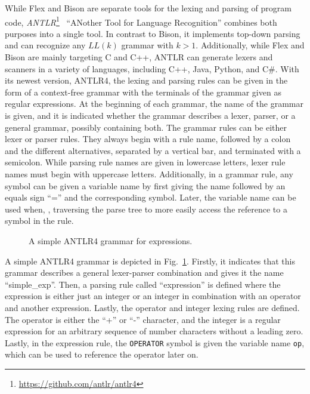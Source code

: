 While Flex and Bison are separate tools for the lexing and parsing of program code, \emph{ANTLR}\footnote{\url{https://github.com/antlr/antlr4}}~\cite{PaQu95} ``ANother Tool for Language Recognition'' combines both purposes into a single tool. In contrast to Bison, it implements top-down parsing and can recognize any $LL(k)$ grammar with $k > 1$. Additionally, while Flex and Bison are mainly targeting C and C++, ANTLR can generate lexers and scanners in a variety of languages, including C++, Java, Python, and C\#.
With its newest version, ANTLR4, the lexing and parsing rules can be given in the form of a context-free grammar with the terminals of the grammar given as regular expressions. At the beginning of each grammar, the name of the grammar is given, and it is indicated whether the grammar describes a lexer, parser, or a general grammar, possibly containing both. The grammar rules can be either lexer or parser rules. They always begin with a rule name, followed by a colon and the different alternatives, separated by a vertical bar, and terminated with a semicolon. While parsing rule names are given in lowercase letters, lexer rule names must begin with uppercase letters.
Additionally, in a grammar rule, any symbol can be given a variable name by first giving the name followed by an equals sign ``='' and the corresponding symbol. Later, the variable name can be used when, \eg, traversing the parse tree to more easily access the reference to a symbol in the rule.

\begin{figure}[htp]
    \centering
    
    \caption{A simple ANTLR4 grammar for expressions.}
    \label{fig:example_antlr4}
\end{figure}

A simple ANTLR4 grammar is depicted in Fig.~\ref{fig:example_antlr4}. Firstly, it indicates that this grammar describes a general lexer-parser combination and gives it the name \mbox{``simple\_exp''}. Then, a parsing rule called ``expression'' is defined where the expression is either just an integer or an integer in combination with an operator and another expression. Lastly, the operator and integer lexing rules are defined. The operator is either the ``+'' or ``-'' character, and the integer is a regular expression for an arbitrary sequence of number characters without a leading zero. Lastly, in the expression rule, the \texttt{OPERATOR} symbol is given the variable name \texttt{op}, which can be used to reference the operator later on.